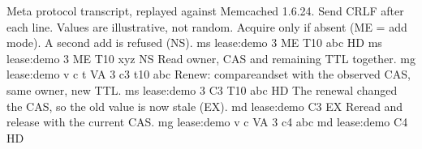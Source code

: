 \PGZsh{} Meta protocol transcript, replayed against Memcached 1.6.24.
\PGZsh{} Send CRLF after each line. Values are illustrative, not random.
\PGZsh{} Acquire only if absent (ME = add mode). A second add is refused (NS).
ms lease:demo 3 ME T10
abc
HD
ms lease:demo 3 ME T10
xyz
NS
\PGZsh{} Read owner, CAS and remaining TTL together.
mg lease:demo v c t
VA 3 c3 t10
abc
\PGZsh{} Renew: compare\PGZhy{}and\PGZhy{}set with the observed CAS, same owner, new TTL.
ms lease:demo 3 C3 T10
abc
HD
\PGZsh{} The renewal changed the CAS, so the old value is now stale (EX).
md lease:demo C3
EX
\PGZsh{} Re\PGZhy{}read and release with the current CAS.
mg lease:demo v c
VA 3 c4
abc
md lease:demo C4
HD
